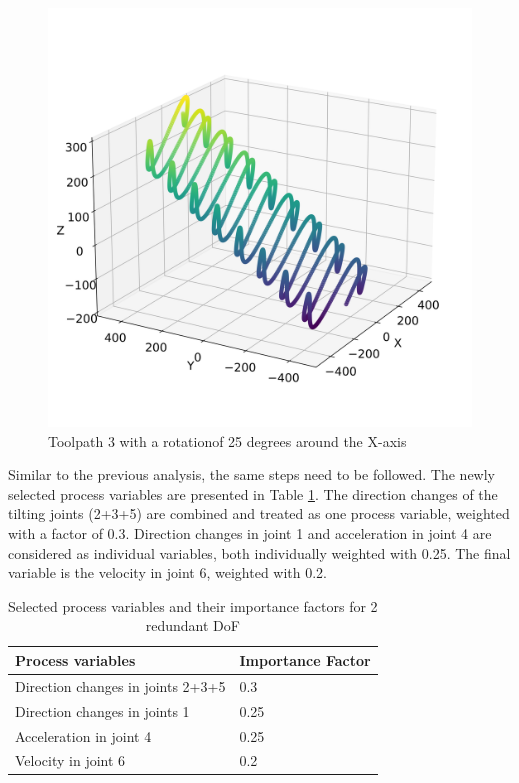 \begin{figure}[H]
\begin{minipage}{0.5\textwidth}
		\includegraphics[width=\textwidth]{figures/path3_kipp_25_comparison.png}
		\caption{Toolpath 3 with a rotation\newline of 25 degrees around the X-axis}
		\label{TP3_25}
	\end{minipage}\par
\end{figure}
 

Similar to the previous analysis, the same steps need to be followed. The newly selected process variables are presented in Table \ref{PP_2}. The direction changes of the tilting joints (2+3+5) are combined and treated as one process variable, weighted with a factor of 0.3. Direction changes in joint 1 and acceleration in joint 4 are considered as individual variables, both individually weighted with 0.25. The final variable is the velocity in joint 6, weighted with 0.2.

\begin{table}[H]
	\centering
	\begin{tabular}{||l|l||}
		Process variables & Importance Factor \\
		\hline
		\hline
		\hline
		Direction changes in joints 2+3+5	&		0.3 \\
		Direction changes in joints 1	&  	0.25 \\
		Acceleration in joint 4	& 		0.25\\
		Velocity in joint 6	& 		0.2\\
		\hline
		\hline
	\end{tabular}
	
	\caption{Selected process variables and their importance factors for 2 redundant DoF}
	\label{PP_2}
\end{table}


